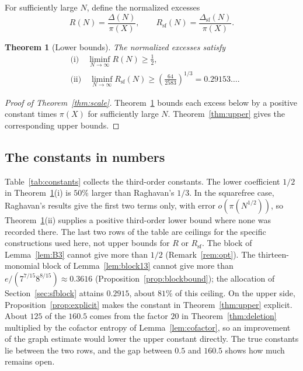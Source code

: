 \documentclass[11pt]{article}
\numberwithin{equation}{section}
\newtheorem{theorem}{Theorem}[section]
\theoremstyle{remark}
\begin{document}
For sufficiently large $N$, define the normalized excesses
\[
R(N)=\frac{\Delta(N)}{\pi(X)},\qquad R_{\mathrm{sf}}(N)=\frac{\Delta_{\mathrm{sf}}(N)}{\pi(X)}.
\]

\begin{theorem}[Lower bounds]\label{thm:lower}
The normalized excesses satisfy
\begin{align*}
&\text{(i)}\quad \liminf_{N\to\infty}R(N)\ge\frac12,\\
&\text{(ii)}\quad \liminf_{N\to\infty}R_{\mathrm{sf}}(N)\ge\left(\frac{64}{2583}\right)^{1/3}=0.29153\ldots.
\end{align*}
\end{theorem}

\begin{proof}[Proof of Theorem~\ref{thm:scale}]
Theorem~\ref{thm:lower} bounds each excess below by a positive constant times $\pi(X)$ for sufficiently large $N$. Theorem~\ref{thm:upper} gives the corresponding upper bounds.
\end{proof}

\subsection*{The constants in numbers}
Table~\ref{tab:constants} collects the third-order constants. The lower coefficient $1/2$ in Theorem~\ref{thm:lower}(i) is $50\%$ larger than Raghavan's $1/3$. In the squarefree case, Raghavan's results give the first two terms only, with error $o(\pi(N^{1/2}))$, so Theorem~\ref{thm:lower}(ii) supplies a positive third-order lower bound where none was recorded there. The last two rows of the table are ceilings for the specific constructions used here, not upper bounds for $R$ or $R_{\mathrm{sf}}$. The block of Lemma~\ref{lem:B3} cannot give more than $1/2$ (Remark~\ref{rem:opt}). The thirteen-monomial block of Lemma~\ref{lem:block13} cannot give more than $e/(7^{7/15}8^{8/15})\approx0.3616$ (Proposition~\ref{prop:blockbound}); the allocation of Section~\ref{sec:sfblock} attains $0.2915$, about $81\%$ of this ceiling. On the upper side, Proposition~\ref{prop:explicit} makes the constant in Theorem~\ref{thm:upper} explicit. About $125$ of the $160.5$ comes from the factor $20$ in Theorem~\ref{thm:deletion} multiplied by the cofactor entropy of Lemma~\ref{lem:cofactor}, so an improvement of the graph estimate would lower the upper constant directly. The true constants lie between the two rows, and the gap between $0.5$ and $160.5$ shows how much remains open.
\end{document}
